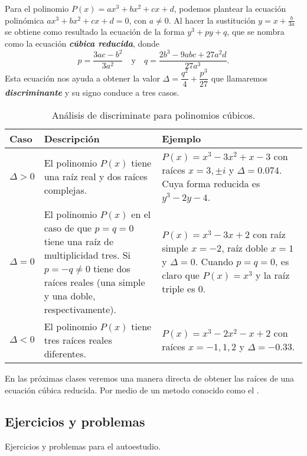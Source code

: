 Para el polinomio $P(x) = ax^3 + bx^2 + cx + d$, podemos plantear la ecuación polinómica $ax^3 + bx^2 + cx + d = 0$, con $a \neq 0$.
Al hacer la sustitución $y = x + \frac{b}{3a}$ se obtiene como resultado la ecuación de la forma $y^3 + py + q$, que se nombra como la ecuación \textbf{\emph{cúbica reducida}}, donde
\[
    p = \frac{3ac - b^2}{3a^2}\quad\text{y}\quad q = \frac{2b^3 - 9abc + 27a^2 d}{27a^3}.
\]
Esta ecuación nos ayuda a obtener la valor $\Delta = \dfrac{q^2}{4} + \dfrac{p^3}{27}$ que llamaremos \textbf{\emph{discriminante}} y su signo conduce a tres casos.
\begin{table}[H]
    \centering
    \begin{tabular}{| p{1.4cm} | p{6.5cm} | p{6.5cm} |}
        \hline
        Caso & Descripción & Ejemplo \\ \hline
        $\Delta > 0$ & El polinomio $P(x)$ tiene una raíz real y dos raíces complejas.&
            $P(x) = x^3 - 3x^2 + x - 3$ con raíces $x = 3, \pm i$ y $\Delta = 0.074$.
            Cuya forma reducida es $y^3 - 2y - 4$. \\\hline
        $\Delta = 0$ & El polinomio $P(x)$ en el caso de que $p = q = 0$ tiene una raíz de multiplicidad tres.
        Si $p = -q \neq 0$ tiene dos raíces reales (una simple y una doble, respectivamente).&
            $P(x) = x^3 - 3x + 2$ con raíz simple $x = -2$, raíz doble $x = 1$ y $\Delta = 0$.
            Cuando $p = q = 0$, es claro que $P(x) = x^3$ y la raíz triple es 0.\\\hline
        $\Delta < 0$ & El polinomio $P(x)$ tiene tres raíces reales diferentes.&
            $P(x) = x^3 - 2x^2 - x + 2$ con raíces $x = -1, 1, 2$ y $\Delta = -0.33$. \\\hline
    \end{tabular}
    \caption{Análisis de discriminate para polinomios cúbicos.}
\end{table}

En las próximas clases veremos una manera directa de obtener las raíces de una ecuación cúbica reducida.
Por medio de un metodo conocido como el .



\subsection{Ejercicios y problemas}

Ejercicios y problemas para el autoestudio.

